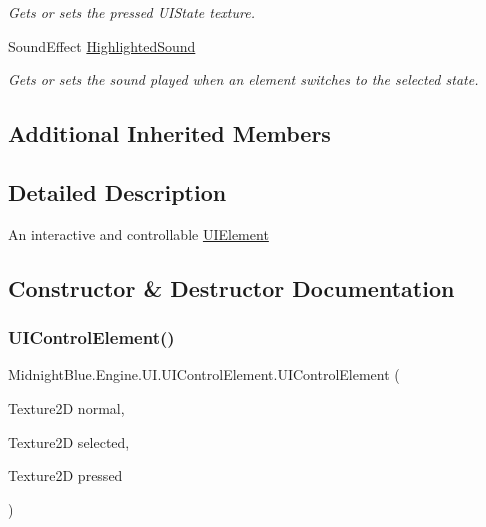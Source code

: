 \begin{DoxyCompactItemize}
\begin{DoxyCompactList}\small\item\em Gets or sets the pressed U\+I\+State texture. \end{DoxyCompactList}\item 
Sound\+Effect \hyperlink{class_midnight_blue_1_1_engine_1_1_u_i_1_1_u_i_control_element_abfb0053d243bc79ddab4e9439641f24b}{Highlighted\+Sound}
\begin{DoxyCompactList}\small\item\em Gets or sets the sound played when an element switches to the selected state. \end{DoxyCompactList}\end{DoxyCompactItemize}
\subsection*{Additional Inherited Members}


\subsection{Detailed Description}
An interactive and controllable \hyperlink{class_midnight_blue_1_1_engine_1_1_u_i_1_1_u_i_element}{U\+I\+Element} 



\subsection{Constructor \& Destructor Documentation}
\hypertarget{class_midnight_blue_1_1_engine_1_1_u_i_1_1_u_i_control_element_aa154266887b21e568194ca4e25068793}{}\label{class_midnight_blue_1_1_engine_1_1_u_i_1_1_u_i_control_element_aa154266887b21e568194ca4e25068793} 
\subsubsection{\texorpdfstring{U\+I\+Control\+Element()}{UIControlElement()}\hspace{0.1cm}{\footnotesize\ttfamily [1/2]}}
{\footnotesize\ttfamily Midnight\+Blue.\+Engine.\+U\+I.\+U\+I\+Control\+Element.\+U\+I\+Control\+Element (\begin{DoxyParamCaption}\item[{Texture2D}]{normal,  }\item[{Texture2D}]{selected,  }\item[{Texture2D}]{pressed }\end{DoxyParamCaption})\hspace{0.3cm}{\ttfamily [inline]}}



